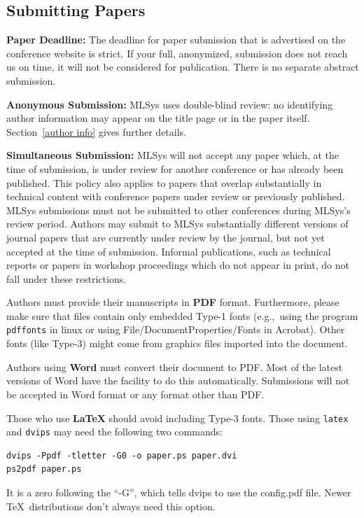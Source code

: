\documentclass{article}
\begin{document}
\subsection{Submitting Papers}

\textbf{Paper Deadline:} The deadline for paper submission that is
advertised on the conference website is strict. If your full,
anonymized, submission does not reach us on time, it will not be
considered for publication. There is no separate abstract submission.

\textbf{Anonymous Submission:} MLSys uses double-blind review: no identifying
author information may appear on the title page or in the paper
itself. Section~\ref{author info} gives further details.

\textbf{Simultaneous Submission:} MLSys will not accept any paper which,
at the time of submission, is under review for another conference or
has already been published. This policy also applies to papers that
overlap substantially in technical content with conference papers
under review or previously published. MLSys submissions must not be
submitted to other conferences during MLSys's review period. Authors
may submit to MLSys substantially different versions of journal papers
that are currently under review by the journal, but not yet accepted
at the time of submission. Informal publications, such as technical
reports or papers in workshop proceedings which do not appear in
print, do not fall under these restrictions.

\medskip

Authors must provide their manuscripts in \textbf{PDF} format.
Furthermore, please make sure that files contain only embedded Type-1 fonts
(e.g.,~using the program \texttt{pdffonts} in linux or using
File/DocumentProperties/Fonts in Acrobat). Other fonts (like Type-3)
might come from graphics files imported into the document.

Authors using \textbf{Word} must convert their document to PDF\@. Most
of the latest versions of Word have the facility to do this
automatically. Submissions will not be accepted in Word format or any
format other than PDF\@.

Those who use \textbf{\LaTeX} should avoid including Type-3 fonts.
Those using \texttt{latex} and \texttt{dvips} may need the following
two commands:

{\footnotesize
\begin{verbatim}
dvips -Ppdf -tletter -G0 -o paper.ps paper.dvi
ps2pdf paper.ps
\end{verbatim}}
It is a zero following the ``-G'', which tells dvips to use
the config.pdf file. Newer \TeX\ distributions don't always need this
option.
\end{document}
